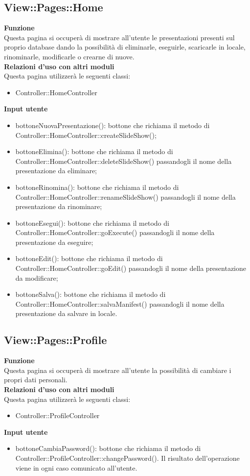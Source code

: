 {\subsection{View::Pages::Home}{
	\textbf{Funzione}\\
	\indent Questa pagina si occuperà di mostrare all'utente le presentazioni presenti sul proprio database dando la possibilità di eliminarle, eseguirle, scaricarle in locale, rinominarle, modificarle o crearne di nuove.\\
	\textbf{Relazioni d'uso con altri moduli}\\
	\indent Questa pagina utilizzerà le seguenti classi:
	\begin{itemize}
		\item Controller::HomeController
	\end{itemize}
	\textbf{Input utente}
	\begin{itemize}
		\item bottoneNuovaPresentazione(): bottone che richiama il metodo di Controller::HomeController::createSlideShow();
		\item bottoneElimina(): bottone che richiama il metodo di Controller::HomeController::deleteSlideShow() passandogli il nome della presentazione da eliminare;
		\item bottoneRinomina(): bottone che richiama il metodo di Controller::HomeController::renameSlideShow() passandogli il nome della presentazione da rinominare;
		\item bottoneEsegui(): bottone che richiama il metodo di Controller::HomeController::goExecute() passandogli il nome della presentazione da eseguire;
		\item bottoneEdit(): bottone che richiama il metodo di Controller::HomeController::goEdit() passandogli il nome della presentazione da modificare;
		\item bottoneSalva(): bottone che richiama il metodo di Controller::HomeController::salvaManifest() passandogli il nome della presentazione da salvare in locale.
	\end{itemize}
	}
\subsection{View::Pages::Profile}{
	\textbf{Funzione}\\
	\indent Questa pagina si occuperà di mostrare all'utente la possibilità di cambiare i propri dati personali.\\
	\textbf{Relazioni d'uso con altri moduli}\\
	\indent Questa pagina utilizzerà le seguenti classi:
	\begin{itemize}
		\item Controller::ProfileController
	\end{itemize}
	\textbf{Input utente}
	\begin{itemize}
		\item bottoneCambiaPassword(): bottone che richiama il metodo di Controller::ProfileController::changePassword(). Il risultato dell'operazione viene in ogni caso comunicato all'utente.
	\end{itemize}
}
}
